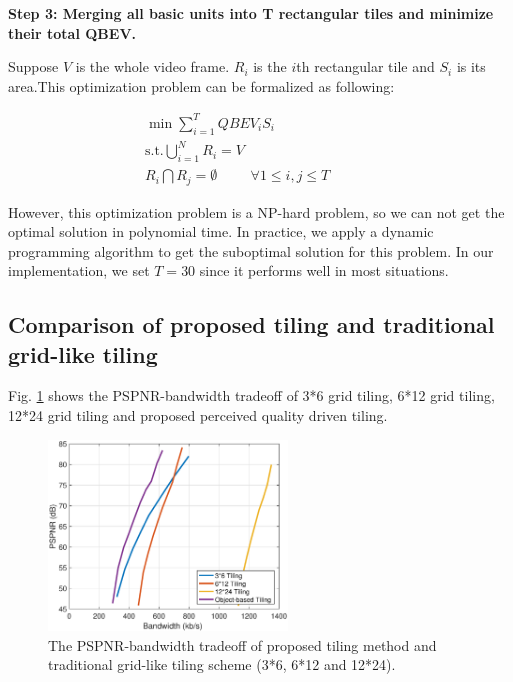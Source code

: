 \textbf{Step 3: Merging all basic units into T rectangular tiles and minimize their total QBEV.}

Suppose $V$ is the whole video frame. $R_i$ is the $i$th rectangular tile and $S_i$ is its area.This optimization problem can be formalized as following:

\begin{equation}
\begin{aligned}
\min \sum_{i = 1}^T QBEV_{i} S_i \hspace{3cm} \\
\text{s.t.} \bigcup _{i=1}^N R_{i} = V\hspace{3cm} \\
R_i \bigcap R_j = \emptyset \hspace{1cm} \forall 1 \le i, j \le T
\end{aligned}
\end{equation}

However, this optimization problem is a NP-hard problem, so we can not get the optimal solution in polynomial time. In practice, we apply a dynamic programming algorithm to get the suboptimal solution for this problem. In our implementation, we set $T = 30$ since it performs well in most situations.

\subsection{Comparison of proposed tiling and traditional grid-like tiling}

Fig. \ref{tiling} shows the PSPNR-bandwidth tradeoff of 3*6 grid tiling, 6*12 grid tiling, 12*24 grid tiling and proposed perceived quality driven tiling. 

  \begin{figure}
  \centering
  \includegraphics[width=2.5in]{images/tiling.eps}
  \caption{The PSPNR-bandwidth tradeoff of proposed tiling method and traditional grid-like tiling scheme (3*6, 6*12 and 12*24).}
  \label{tiling}
  \end{figure}


